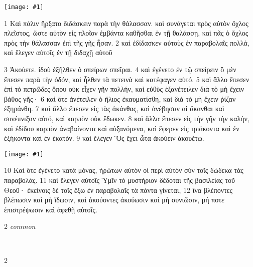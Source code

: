 \documentclass[10pt,a5paper,twoside,twocolumn]{book}
\newcommand{\fig}[1]{\texttt{[image: \#1]}\label{fig:#1}}
\newcommand*\cleartoleftpage{%
  \ifodd\value{page}\hbox{}\clearpage\fi
}
\newcommand{\separator}{
  \vspace{-0.5\baselineskip}%
  \hspace{0.27\textwidth}%
  \noindent\makebox[\linewidth]{\resizebox{0.3333\linewidth}{1pt}{$\bullet$}}\bigskip%
  \vspace{-0.5\baselineskip}
}
\newenvironment{facing}{\cleartoleftpage}{\clearpage\pagebreak}
\newenvironment{help}{\clearpage}{}
\newenvironment{helpsec}{\begin{minipage}[t]{\textwidth}\begin{multicols}{2}}{\end{multicols}\end{minipage}}
\newenvironment{vocab}{\begin{helpsec}}{\end{helpsec}}
\newenvironment{translation}{\separator\\\begin{helpsec}\footnotesize}{\end{helpsec}}
\begin{document}

\begin{facing}

\fig{04-01} %

	1 Καὶ πάλιν ἤρξατο διδάσκειν παρὰ τὴν θάλασσαν. καὶ συνάγεται πρὸς αὐτὸν ὄχλος πλεῖστος, ὥστε αὐτὸν εἰς πλοῖον ἐμβάντα καθῆσθαι ἐν τῇ θαλάσσῃ, καὶ πᾶς ὁ ὄχλος πρὸς τὴν θάλασσαν ἐπὶ τῆς γῆς ἦσαν. 2 καὶ ἐδίδασκεν αὐτοὺς ἐν παραβολαῖς πολλά, καὶ ἔλεγεν αὐτοῖς ἐν τῇ διδαχῇ αὐτοῦ 

\enlargethispage{\baselineskip}

3 Ἀκούετε. ἰδοὺ ἐξῆλθεν ὁ σπείρων σπεῖραι. 4 καὶ ἐγένετο ἐν τῷ σπείρειν ὃ μὲν ἔπεσεν παρὰ τὴν ὁδόν, καὶ ἦλθεν τὰ πετεινὰ καὶ κατέφαγεν αὐτό. 5 καὶ ἄλλο ἔπεσεν ἐπὶ τὸ πετρῶδες ὅπου οὐκ εἶχεν γῆν πολλήν, καὶ εὐθὺς ἐξανέτειλεν διὰ τὸ μὴ ἔχειν βάθος γῆς· 6 καὶ ὅτε ἀνέτειλεν ὁ ἥλιος ἐκαυματίσθη, καὶ διὰ τὸ μὴ ἔχειν ῥίζαν ἐξηράνθη. 7 καὶ ἄλλο ἔπεσεν εἰς τὰς ἀκάνθας, καὶ ἀνέβησαν αἱ ἄκανθαι καὶ συνέπνιξαν αὐτό, καὶ καρπὸν οὐκ ἔδωκεν. 8 καὶ ἄλλα ἔπεσεν εἰς τὴν γῆν τὴν καλήν, καὶ ἐδίδου καρπὸν ἀναβαίνοντα καὶ αὐξανόμενα, καὶ ἔφερεν εἰς τριάκοντα καὶ ἐν ἑξήκοντα καὶ ἐν ἑκατόν. 9 καὶ ἔλεγεν Ὃς ἔχει ὦτα ἀκούειν ἀκουέτω. 

\fig{04-03} %

\enlargethispage{\baselineskip}

10 Καὶ ὅτε ἐγένετο κατὰ μόνας, ἠρώτων αὐτὸν οἱ περὶ αὐτὸν σὺν τοῖς δώδεκα τὰς παραβολάς. 11 καὶ ἔλεγεν αὐτοῖς Ὑμῖν τὸ μυστήριον δέδοται τῆς βασιλείας τοῦ Θεοῦ· ἐκείνοις δὲ τοῖς ἔξω ἐν παραβολαῖς τὰ πάντα γίνεται, 12 ἵνα 
	βλέποντες βλέπωσιν καὶ μὴ ἴδωσιν, 
	καὶ ἀκούοντες ἀκούωσιν καὶ μὴ συνιῶσιν, 
		μή ποτε ἐπιστρέψωσιν καὶ ἀφεθῇ αὐτοῖς.

\begin{help}
\begin{vocab}
\emph{common}\\

\end{vocab}
\begin{translation}

\end{translation}
\end{help}
\end{facing}
\end{document}
